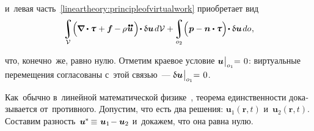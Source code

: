 \begin{otherlanguage}{russian}
\vspace{-0.2em} \noindent и~левая часть~\eqref{lineartheory:principleofvirtualwork} приобретает вид
\[
\integral\displaylimits_{\mathcal{V}} \hspace{-0.5ex} \left(^{\mathstrut} \hspace{-0.2ex} \boldnabla \dotp \mathboldtau \hspace{0.12ex} + \bm{f} \hspace{-0.1ex} - \hspace{-0.1ex} \rho \hspace{0.1ex} \mathdotdotabove{\bm{u}} \hspace{0.25ex} \right) \hspace{-0.32ex} \dotp \variation{\bm{u}} \hspace{0.25ex} d\mathcal{V} + \hspace{-0.2ex}
\integral\displaylimits_{o_2} \hspace{-0.5ex} \left(^{\mathstrut} \bm{p} - \bm{n} \dotp \mathboldtau \right) \hspace{-0.32ex} \dotp \variation{\bm{u}} \hspace{0.25ex} do \hspace{0.1ex},
\]

\vspace{-0.4em} \noindent что, конечно~же, равно нулю. Отметим краевое условие ${\bm{u} \hspace{0.1ex} \bigr|_{o_1} \hspace{-0.64ex} = \hspace{0.2ex} 0}$: виртуальные перемещения согласованы с~этой связью~--- ${\updelta\hspace{-0.1ex}\bm{u} \hspace{0.1ex} \bigr|_{o_1} \hspace{-0.64ex} = \hspace{0.2ex} 0}$.



\label{para:uniquenessfordynamicproblem}

Как~обычно в~линейной математической физике~\cite{lurie-theoryofelasticity, tihonovsamarsky-mathphysicsequations}, теорема единственности доказывается от~противного. Допустим, что есть два решения: ${\bm{u}_1 (\bm{r}, t)}$ и~${\bm{u}_2 (\bm{r}, t)}$. Составим разность~${\bm{u}^{\hspace{-0.1ex}*} \hspace{-0.2ex} \equiv \hspace{0.12ex} \bm{u}_1 \hspace{-0.32ex} - \bm{u}_2}$ и~докажем, что она равна нулю.


\end{otherlanguage}
